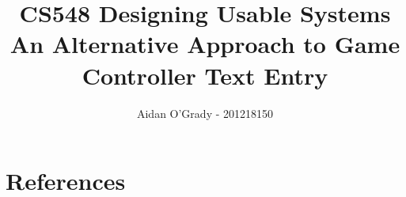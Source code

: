 \documentclass[11pt, a4paper]{article}
\begin{document}
\title{CS548 Designing Usable Systems\\
\large{An Alternative Approach to Game Controller Text Entry}}
\author{Aidan O'Grady - 201218150}
\date{}
\maketitle
\tableofcontents
\newpage





\newpage














\newpage
\appendix
\section{References} %
\label{sec:references}
\printbibliography[heading=none]
\end{document}
